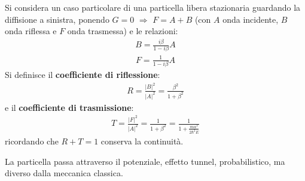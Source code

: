 Si considera un caso particolare di una particella libera stazionaria guardando la diffisione a sinistra, ponendo $G=0$ $\Longrightarrow $ $F=A+B$ (con $A$ onda incidente, $B$ onda riflessa e $F$ onda trasmessa) e le relazioni:
\begin{equation}\begin{split}
B=\frac{i\beta}{1-i\beta}A
\end{split}\end{equation}
\begin{equation}\begin{split}
F=\frac{1}{1-i\beta}A
\end{split}\end{equation}
Si definisce il \textbf{coefficiente di riflessione}:
\begin{equation}\begin{split}
R=\frac{|B|^2}{|A|^2}=\frac{\beta^2}{1+\beta^2}
\end{split}\end{equation}
e il \textbf{coefficiente di trasmissione}:
\begin{equation}\begin{split}
T=\frac{|F|^2}{|A|^2}=\frac{1}{1+\beta^2}=\frac{1}{1+\frac{m\alpha^2}{2\hbar ^2E}}
\end{split}\end{equation}
ricordando che $R+T=1$ conserva la continuità.

La particella passa attraverso il potenziale, effetto tunnel, probabilistico, ma diverso dalla meccanica classica.

